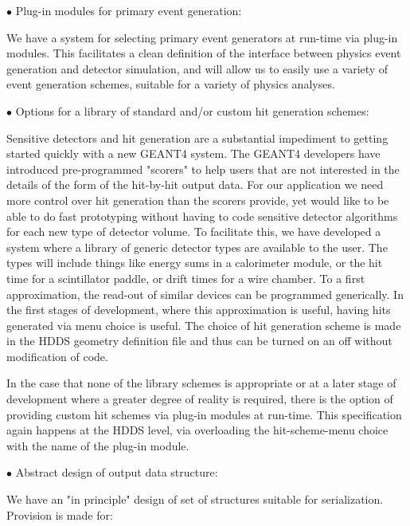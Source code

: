 \documentclass[12pt]{article}
\begin{document}
\vskip 0.5cm

\noindent
$\bullet$ Plug-in modules for primary event generation:

We have a system for selecting primary event generators at run-time via 
plug-in modules. This facilitates a clean definition of the interface between 
physics event generation and detector simulation, and will allow us to easily 
use a variety of event generation schemes, suitable for a variety of physics 
analyses.

\vskip 0.3cm

\noindent
$\bullet$ Options for a library of standard and/or custom hit generation 
schemes:

Sensitive detectors and hit generation are a substantial impediment to 
getting started quickly with a new GEANT4 system. The GEANT4 developers have 
introduced pre-programmed "scorers" to help users that are not interested in 
the details of the form of the hit-by-hit output data. For our application we 
need more control over hit generation than the scorers provide, yet would like 
to be able to do fast prototyping without having to code sensitive detector 
algorithms for each new type of detector volume. To facilitate this, we have 
developed a system where a library of generic detector types are available to 
the user. The types will include things like energy sums in a calorimeter 
module, or the hit time for a scintillator paddle, or drift times for a wire 
chamber. To a first approximation, the read-out of similar devices can be 
programmed generically. In the first stages of development, where this 
approximation is useful, having hits generated via menu choice is useful. 
The choice of hit generation scheme is made in the HDDS geometry definition 
file and thus can be turned on an off without modification of code.

In the case that none of the library schemes is appropriate or at a later 
stage of development where a greater degree of reality is required, there 
is the option of providing custom hit schemes via plug-in modules at run-time. 
This specification again happens at the HDDS level, via overloading the 
hit-scheme-menu choice with the name of the plug-in module.

\vskip 0.3cm

\noindent
$\bullet$ Abstract design of output data structure:

We have an "in principle" design of set of structures suitable for 
serialization. Provision is made for:
\end{document}
